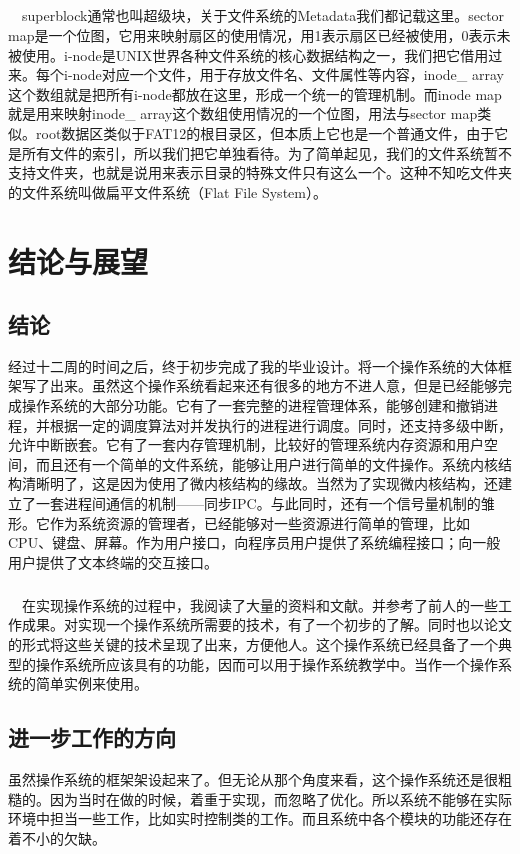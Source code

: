 \documentclass[UTF8,nofonts,cs4size]{ctexrep}
\begin{document}
\paragraph{}
\indent \ \ 
superblock通常也叫超级块，关于文件系统的Metadata我们都记载这里。sector map是一个位图，它用来映射扇区的使用情况，用1表示扇区已经被使用，0表示未被使用。i-node是UNIX世界各种文件系统的核心数据结构之一，我们把它借用过来。每个i-node对应一个文件，用于存放文件名、文件属性等内容，inode\_ array这个数组就是把所有i-node都放在这里，形成一个统一的管理机制。而inode map就是用来映射inode\_ array这个数组使用情况的一个位图，用法与sector map类似。root数据区类似于FAT12的根目录区，但本质上它也是一个普通文件，由于它是所有文件的索引，所以我们把它单独看待。为了简单起见，我们的文件系统暂不支持文件夹，也就是说用来表示目录的特殊文件只有这么一个。这种不知吃文件夹的文件系统叫做扁平文件系统（Flat File System）。
\chapter{结论与展望}
\section{结论}
经过十二周的时间之后，终于初步完成了我的毕业设计。将一个操作系统的大体框架写了出来。虽然这个操作系统看起来还有很多的地方不进人意，但是已经能够完成操作系统的大部分功能。它有了一套完整的进程管理体系，能够创建和撤销进程，并根据一定的调度算法对并发执行的进程进行调度。同时，还支持多级中断，允许中断嵌套。它有了一套内存管理机制，比较好的管理系统内存资源和用户空间，而且还有一个简单的文件系统，能够让用户进行简单的文件操作。系统内核结构清晰明了，这是因为使用了微内核结构的缘故。当然为了实现微内核结构，还建立了一套进程间通信的机制——同步IPC。与此同时，还有一个信号量机制的雏形。它作为系统资源的管理者，已经能够对一些资源进行简单的管理，比如CPU、键盘、屏幕。作为用户接口，向程序员用户提供了系统编程接口；向一般用户提供了文本终端的交互接口。
\paragraph{}
\indent \ \ 
在实现操作系统的过程中，我阅读了大量的资料和文献。并参考了前人的一些工作成果。对实现一个操作系统所需要的技术，有了一个初步的了解。同时也以论文的形式将这些关键的技术呈现了出来，方便他人。这个操作系统已经具备了一个典型的操作系统所应该具有的功能，因而可以用于操作系统教学中。当作一个操作系统的简单实例来使用。
\section{进一步工作的方向}
虽然操作系统的框架架设起来了。但无论从那个角度来看，这个操作系统还是很粗糙的。因为当时在做的时候，着重于实现，而忽略了优化。所以系统不能够在实际环境中担当一些工作，比如实时控制类的工作。而且系统中各个模块的功能还存在着不小的欠缺。
\end{document}
